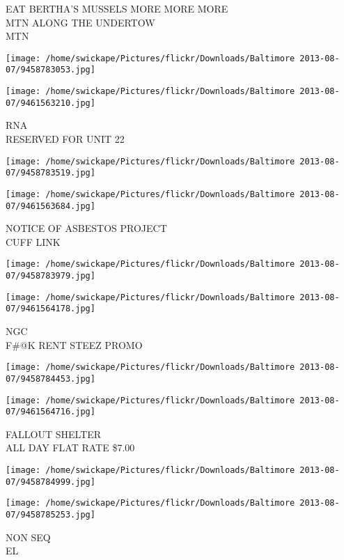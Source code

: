 \documentclass[10pt,letterpaper]{article}
\begin{document}
EAT BERTHA'S MUSSELS MORE MORE MORE\\
MTN ALONG THE UNDERTOW\\
MTN
\pagebreak

\texttt{[image: /home/swickape/Pictures/flickr/Downloads/Baltimore 2013-08-07/9458783053.jpg]}

\vspace{0.25in}
\texttt{[image: /home/swickape/Pictures/flickr/Downloads/Baltimore 2013-08-07/9461563210.jpg]}

RNA\\
RESERVED FOR UNIT 22
\pagebreak

\texttt{[image: /home/swickape/Pictures/flickr/Downloads/Baltimore 2013-08-07/9458783519.jpg]}

\vspace{0.25in}
\texttt{[image: /home/swickape/Pictures/flickr/Downloads/Baltimore 2013-08-07/9461563684.jpg]}

NOTICE OF ASBESTOS PROJECT\\
CUFF LINK
\pagebreak

\texttt{[image: /home/swickape/Pictures/flickr/Downloads/Baltimore 2013-08-07/9458783979.jpg]}

\vspace{0.25in}
\texttt{[image: /home/swickape/Pictures/flickr/Downloads/Baltimore 2013-08-07/9461564178.jpg]}

NGC\\
F\#@K RENT STEEZ PROMO
\pagebreak

\texttt{[image: /home/swickape/Pictures/flickr/Downloads/Baltimore 2013-08-07/9458784453.jpg]}

\vspace{0.25in}
\texttt{[image: /home/swickape/Pictures/flickr/Downloads/Baltimore 2013-08-07/9461564716.jpg]}

FALLOUT SHELTER\\
ALL DAY FLAT RATE \$7.00
\pagebreak

\texttt{[image: /home/swickape/Pictures/flickr/Downloads/Baltimore 2013-08-07/9458784999.jpg]}

\vspace{0.25in}
\texttt{[image: /home/swickape/Pictures/flickr/Downloads/Baltimore 2013-08-07/9458785253.jpg]}

NON SEQ\\
EL
\pagebreak
\end{document}

